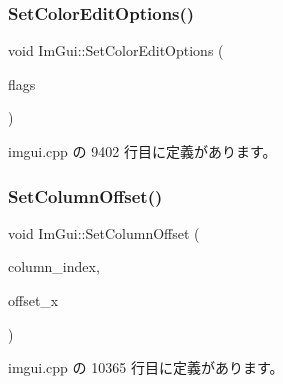 \subsubsection{\texorpdfstring{Set\+Color\+Edit\+Options()}{SetColorEditOptions()}}
{\footnotesize\ttfamily void Im\+Gui\+::\+Set\+Color\+Edit\+Options (\begin{DoxyParamCaption}\item[{\mbox{\hyperlink{imgui_8h_a6b2d5e95adc38f22c021252189f669c6}{Im\+Gui\+Color\+Edit\+Flags}}}]{flags }\end{DoxyParamCaption})}



 imgui.\+cpp の 9402 行目に定義があります。

\mbox{\label{namespace_im_gui_a8cc207211d6cf3f77b505e24aed4ebcc}} 
\subsubsection{\texorpdfstring{Set\+Column\+Offset()}{SetColumnOffset()}}
{\footnotesize\ttfamily void Im\+Gui\+::\+Set\+Column\+Offset (\begin{DoxyParamCaption}\item[{int}]{column\+\_\+index,  }\item[{float}]{offset\+\_\+x }\end{DoxyParamCaption})}



 imgui.\+cpp の 10365 行目に定義があります。

